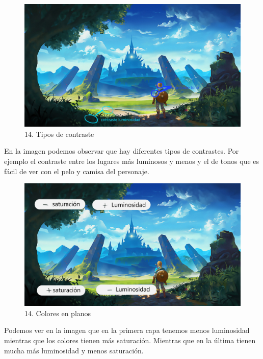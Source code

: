 \documentclass[12pt]{article}
\begin{document}
    \begin{figure}[H]
      \centering
      \includegraphics[width=\textwidth]{images/Selena/14_concept_art con.jpg}
      \caption{\small 14. Tipos de contraste}
    \end{figure}
    En la imagen podemos observar que hay diferentes tipos de contrastes. Por ejemplo el contraste entre los lugares más luminosos y menos y el de tonos que es fácil de ver con el pelo y camisa del personaje. 

    \begin{figure}[H]
      \centering
      \includegraphics[width=\textwidth]{images/Selena/14_concept_art r.jpg}
      \caption{\small 14. Colores en planos}
    \end{figure}
    Podemos ver en la imagen que en la primera capa tenemos menos luminosidad mientras que los colores tienen más saturación. Mientras que en la última tienen mucha más luminosidad y menos saturación.

        \newpage

\end{document}
